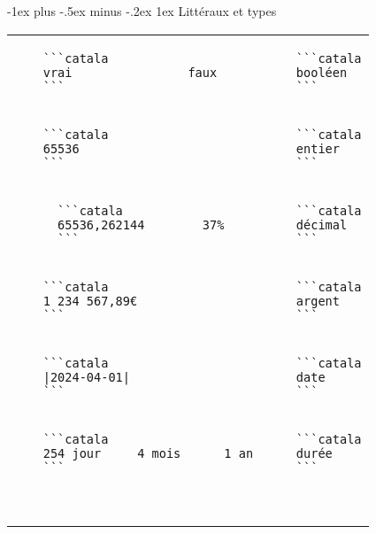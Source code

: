 \documentclass{article}
\makeatletter
\newcommand\articlenormalsize{\fontsize{10pt}{12pt}\selectfont}
\renewcommand{\section}{\@startsection{section}{1}{0mm}%
                                {-1ex plus -.5ex minus -.2ex}%
                                {1ex}%
                                {\normalfont\articlenormalsize\bfseries}}
\newenvironment{catala}{%
  \VerbatimEnvironment
  \let\FV@ListVSpace\relax
  \begin{verbatim}}%
 {\end{verbatim}}
\makeatother
\begin{document}
\begin{multicols}{3}
\vspace{-5pt}

\section{Littéraux et types}

\begin{tabular}{@{}p{\cola}p{\colb}@{}}

  \begin{catala}
    ```catala
    vrai                faux
    ```
  \end{catala}
  & \begin{catala}
    ```catala
    booléen
    ```
  \end{catala}
  \\
  \begin{catala}
    ```catala
    65536
    ```
  \end{catala}
  & \begin{catala}
    ```catala
    entier
    ```
  \end{catala}
  \\
  \begin{catala}
      ```catala
      65536,262144        37%
      ```
    \end{catala}
  & \begin{catala}
    ```catala
    décimal
    ```
  \end{catala}
  \\
  \begin{catala}
    ```catala
    1 234 567,89€
    ```
  \end{catala}
  & \begin{catala}
    ```catala
    argent
    ```
  \end{catala}
  \\
  \begin{catala}
    ```catala
    |2024-04-01|
    ```
  \end{catala}
  & \begin{catala}
    ```catala
    date
    ```
  \end{catala}
  \\
  \begin{catala}
    ```catala
    254 jour     4 mois      1 an
    ```
  \end{catala}
  & \begin{catala}
    ```catala
    durée
    ```
  \end{catala}
  \\
  \begin{catala}

\end{catala}
\end{tabular}
\end{multicols}
\end{document}

